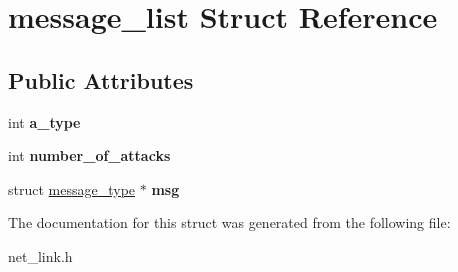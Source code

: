 \hypertarget{structmessage__list}{\section{message\-\_\-list Struct Reference}
\label{structmessage__list}
}
\subsection*{Public Attributes}
\begin{DoxyCompactItemize}
\item 
\hypertarget{structmessage__list_a74fceaced03e336bdf83ca08d63515ab}{int {\bfseries a\-\_\-type}}\label{structmessage__list_a74fceaced03e336bdf83ca08d63515ab}

\item 
\hypertarget{structmessage__list_a2484b3f342cb61930c1c7dd58b13af39}{int {\bfseries number\-\_\-of\-\_\-attacks}}\label{structmessage__list_a2484b3f342cb61930c1c7dd58b13af39}

\item 
\hypertarget{structmessage__list_aa9f384ba025827ef0a3ec15d6b78a478}{struct \hyperlink{structmessage__type}{message\-\_\-type} $\ast$ {\bfseries msg}}\label{structmessage__list_aa9f384ba025827ef0a3ec15d6b78a478}

\end{DoxyCompactItemize}


The documentation for this struct was generated from the following file\-:\begin{DoxyCompactItemize}
\item 
net\-\_\-link.\-h\end{DoxyCompactItemize}
